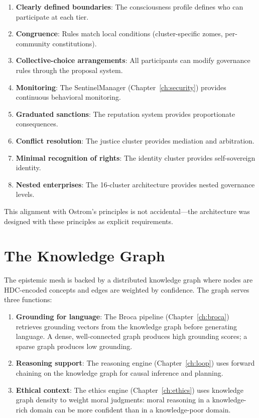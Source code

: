 \documentclass[12pt]{book}
\begin{document}
\begin{enumerate}
  \item \textbf{Clearly defined boundaries}: The consciousness profile defines who can participate at each tier.
  \item \textbf{Congruence}: Rules match local conditions (cluster-specific zomes, per-community constitutions).
  \item \textbf{Collective-choice arrangements}: All participants can modify governance rules through the proposal system.
  \item \textbf{Monitoring}: The SentinelManager (Chapter~\ref{ch:security}) provides continuous behavioral monitoring.
  \item \textbf{Graduated sanctions}: The reputation system provides proportionate consequences.
  \item \textbf{Conflict resolution}: The justice cluster provides mediation and arbitration.
  \item \textbf{Minimal recognition of rights}: The identity cluster provides self-sovereign identity.
  \item \textbf{Nested enterprises}: The 16-cluster architecture provides nested governance levels.
\end{enumerate}

This alignment with Ostrom's principles is not accidental---the architecture was designed with these principles as explicit requirements.

\section{The Knowledge Graph}

The epistemic mesh is backed by a distributed knowledge graph where nodes are HDC-encoded concepts and edges are weighted by confidence. The graph serves three functions:

\begin{enumerate}
  \item \textbf{Grounding for language}: The Broca pipeline (Chapter~\ref{ch:broca}) retrieves grounding vectors from the knowledge graph before generating language. A dense, well-connected graph produces high grounding scores; a sparse graph produces low grounding.
  \item \textbf{Reasoning support}: The reasoning engine (Chapter~\ref{ch:loop}) uses forward chaining on the knowledge graph for causal inference and planning.
  \item \textbf{Ethical context}: The ethics engine (Chapter~\ref{ch:ethics}) uses knowledge graph density to weight moral judgments: moral reasoning in a knowledge-rich domain can be more confident than in a knowledge-poor domain.
\end{enumerate}
\end{document}
